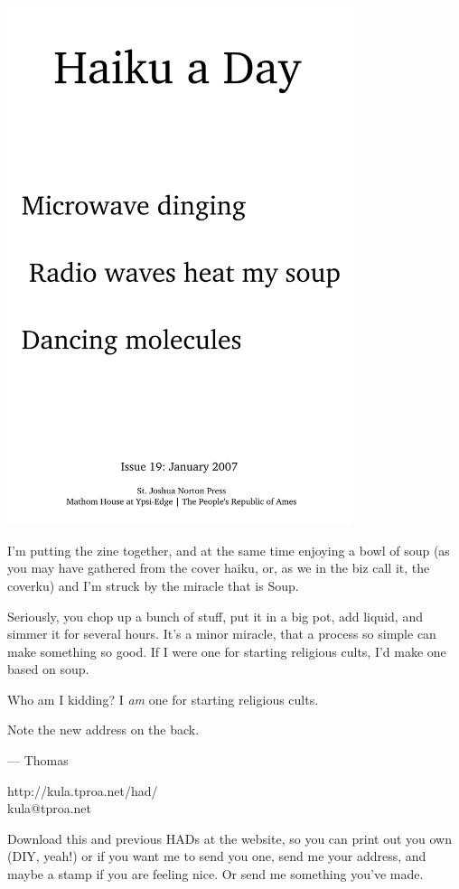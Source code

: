 \documentclass[12pt]{article}
\begin{document}
\includegraphics[width=101mm]{frontpage.png}

\newpage

I'm putting the zine together, and at the same time enjoying
a bowl of soup (as you may have gathered from the cover haiku, or,
as we in the biz call it, the coverku) and I'm struck by the
miracle that is Soup.

Seriously, you chop up a bunch of stuff, put it in a big pot,
add liquid, and simmer it for several hours. It's a minor
miracle, that a process so simple can make something so good.
If I were one for starting religious cults, I'd make one 
based on soup.

Who am I kidding? I {\em am} one for starting religious cults.

Note the new address on the back. 

--- Thomas

http://kula.tproa.net/had/ \\
kula@tproa.net

Download this and previous HADs at the website, so you can
print out you own (DIY, yeah!) or if you want me to send
you one, send me your address, and maybe a stamp if you
are feeling nice. Or send me something you've made.
\end{document}
